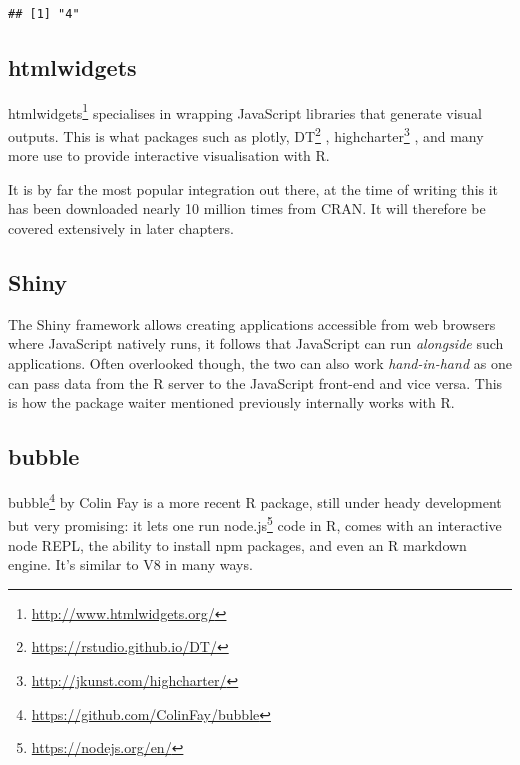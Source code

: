 \documentclass[
]{krantz}
\makeatletter
\newenvironment{Shaded}{\begin{snugshade}}{\end{snugshade}}
\newcommand{\CommentTok}[1]{\textcolor[rgb]{0.37,0.37,0.37}{\textit{#1}}}
\newcommand{\KeywordTok}[1]{\textcolor[rgb]{0.27,0.27,0.27}{\textbf{#1}}}
\newcommand{\NormalTok}[1]{#1}
\newcommand{\OperatorTok}[1]{\textcolor[rgb]{0.43,0.43,0.43}{\textbf{#1}}}
\newcommand{\StringTok}[1]{\textcolor[rgb]{0.5,0.5,0.5}{#1}}
\renewcommand{\href}[2]{#2\footnote{\url{#1}}}
\newenvironment{kframe}{%
\medskip{}
\setlength{\fboxsep}{.8em}
 \def\at@end@of@kframe{}%
 \ifinner\ifhmode%
  \def\at@end@of@kframe{\end{minipage}}%
  \begin{minipage}{\columnwidth}%
 \fi\fi%
 \def\FrameCommand##1{\hskip\@totalleftmargin \hskip-\fboxsep
 \colorbox{shadecolor}{##1}\hskip-\fboxsep
     \hskip-\linewidth \hskip-\@totalleftmargin \hskip\columnwidth}%
 \MakeFramed {\advance\hsize-\width
   \@totalleftmargin\z@ \linewidth\hsize
   \@setminipage}}%
 {\par\unskip\endMakeFramed%
 \at@end@of@kframe}
\renewenvironment{Shaded}{\begin{kframe}}{\end{kframe}}
\makeatother
\begin{document}
\begin{verbatim}
## [1] "4"
\end{verbatim}

\hypertarget{intro-htmlwidgets}{%
\subsection{htmlwidgets}\label{intro-htmlwidgets}}

\href{http://www.htmlwidgets.org/}{htmlwidgets} \citep{R-htmlwidgets} specialises in wrapping JavaScript libraries that generate visual outputs. This is what packages such as plotly, \href{https://rstudio.github.io/DT/}{DT} \citep{R-DT}, \href{http://jkunst.com/highcharter/}{highcharter} \citep{R-highcharter}, and many more use to provide interactive visualisation with R.

It is by far the most popular integration out there, at the time of writing this it has been downloaded nearly 10 million times from CRAN. It will therefore be covered extensively in later chapters.

\hypertarget{intro-shiny}{%
\subsection{Shiny}\label{intro-shiny}}

The Shiny framework allows creating applications accessible from web browsers where JavaScript natively runs, it follows that JavaScript can run \emph{alongside} such applications. Often overlooked though, the two can also work \emph{hand-in-hand} as one can pass data from the R server to the JavaScript front-end and vice versa. This is how the package waiter mentioned previously internally works with R.

\hypertarget{intro-bubble}{%
\subsection{bubble}\label{intro-bubble}}

\href{https://github.com/ColinFay/bubble}{bubble} \citep{R-bubble} by Colin Fay is a more recent R package, still under heady development but very promising: it lets one run \href{https://nodejs.org/en/}{node.js} code in R, comes with an interactive node REPL, the ability to install npm packages, and even an R markdown engine. It's similar to V8 in many ways.

\begin{Shaded}
\end{Shaded}
\end{document}

